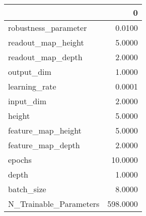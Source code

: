 \begin{tabular}{lr}
\toprule
{} &         0 \\
\midrule
robustness\_parameter   &    0.0100 \\
readout\_map\_height     &    5.0000 \\
readout\_map\_depth      &    2.0000 \\
output\_dim             &    1.0000 \\
learning\_rate          &    0.0001 \\
input\_dim              &    2.0000 \\
height                 &    5.0000 \\
feature\_map\_height     &    5.0000 \\
feature\_map\_depth      &    2.0000 \\
epochs                 &   10.0000 \\
depth                  &    1.0000 \\
batch\_size             &    8.0000 \\
N\_Trainable\_Parameters &  598.0000 \\
\bottomrule
\end{tabular}

